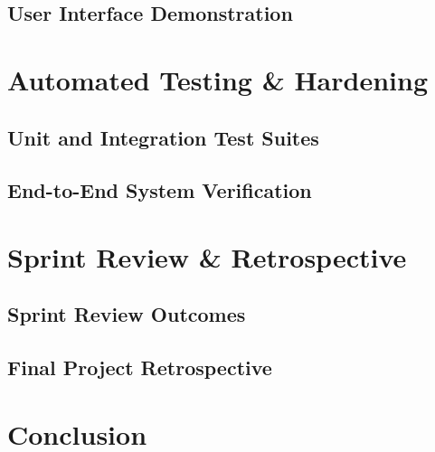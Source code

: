 \subsection{User Interface Demonstration}
\label{subsec:ch6_ui_screenshots}

\section{Automated Testing \& Hardening}
\label{sec:ch6_testing_hardening}
\subsection{Unit and Integration Test Suites}
\label{subsec:ch6_test_suites}

\subsection{End-to-End System Verification}
\label{subsec:ch6_e2e_verification}

\section{Sprint Review \& Retrospective}
\label{sec:ch6_review_retro}
\subsection{Sprint Review Outcomes}
\label{subsec:ch6_review}

\subsection{Final Project Retrospective}
\label{subsec:ch6_retro}

\section{Conclusion}
\label{sec:ch6_conclusion}
